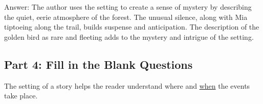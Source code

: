 \documentclass[12pt]{article}
\begin{document}
Answer: The author uses the setting to create a sense of mystery by describing the quiet, eerie atmosphere of the forest. The unusual silence, along with Mia tiptoeing along the trail, builds suspense and anticipation. The description of the golden bird as rare and fleeting adds to the mystery and intrigue of the setting.

\subsection*{Part 4: Fill in the Blank Questions}

The setting of a story helps the reader understand where and \underline{when} the events take place.
\end{document}

